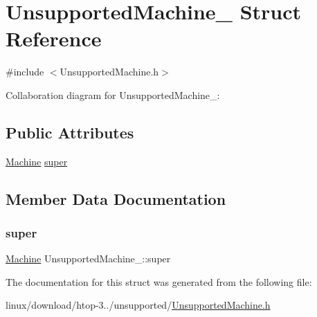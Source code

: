 \hypertarget{structUnsupportedMachine__}{}\section{Unsupported\+Machine\+\_\+ Struct Reference}
\label{structUnsupportedMachine__}


{\ttfamily \#include $<$Unsupported\+Machine.\+h$>$}



Collaboration diagram for Unsupported\+Machine\+\_\+\+:
\subsection*{Public Attributes}
\begin{DoxyCompactItemize}
\item 
\hyperlink{Machine_8h_aa3706f95e4706b9d02979efcabb1341d}{Machine} \hyperlink{structUnsupportedMachine___ad5ab9af669b72684c688762c9a54a879}{super}
\end{DoxyCompactItemize}


\subsection{Member Data Documentation}
\mbox{\label{structUnsupportedMachine___ad5ab9af669b72684c688762c9a54a879}} 
\subsubsection{\texorpdfstring{super}{super}}
{\footnotesize\ttfamily \hyperlink{Machine_8h_aa3706f95e4706b9d02979efcabb1341d}{Machine} Unsupported\+Machine\+\_\+\+::super}



The documentation for this struct was generated from the following file\+:\begin{DoxyCompactItemize}
\item 
linux/download/htop-\/3../unsupported/\hyperlink{UnsupportedMachine_8h}{Unsupported\+Machine.\+h}\end{DoxyCompactItemize}
